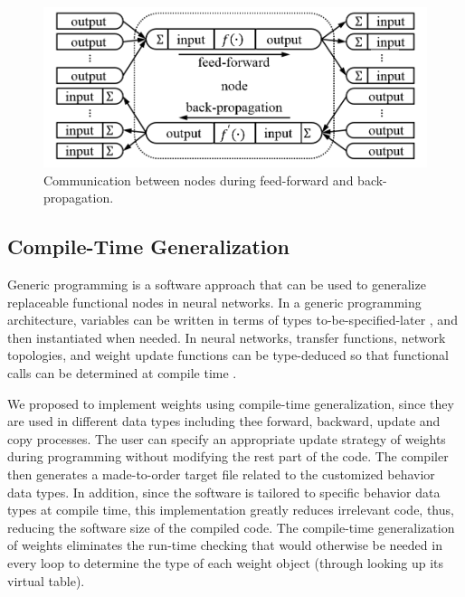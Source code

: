 \documentclass[procedia]{easychair}
\begin{document}
\begin{figure}[tb]
    \begin{centering}
        \includegraphics[scale=0.5]{../pic/microscopic.png}
        \caption{Communication between nodes during feed-forward and back-propagation.}
        \label{fig:microscopic}
	\end{centering}
\end{figure}

\subsection{Compile-Time Generalization}

Generic programming is a software approach that can be used to generalize replaceable functional nodes in neural networks.   In a generic programming architecture, variables can be written in terms of types to-be-specified-later  \cite{wiki:generic_programming}, and then instantiated when needed.  In neural networks, transfer functions, network topologies, and weight update functions can be type-deduced so that functional calls can be determined at compile time  \cite{alexandrescu2001preface}.

We proposed to implement weights using compile-time generalization, since they are used in different data types including thee forward, backward, update and copy processes.  The user can specify an appropriate update strategy of weights during programming without modifying the rest part of the code.  The compiler then generates a made-to-order target file related to the customized behavior data types.  In addition, since the software is tailored to specific behavior data types at compile time, this implementation greatly reduces irrelevant code, thus, reducing the software size of the compiled code.   The compile-time generalization of weights eliminates the run-time checking that would otherwise be needed in every loop to determine the type of each weight object (through looking up its virtual table).
\end{document}
